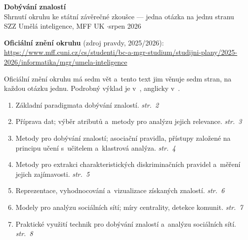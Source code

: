 \documentclass[10pt,a4paper]{article}
\begin{document}
\raggedcolumns   %

\thispagestyle{empty}
\begin{center}
{\LARGE\bfseries Dobývání znalostí}\\[0.4em]
{\large Shrnutí okruhu ke státní závěrečné zkoušce --- jedna otázka na jednu stranu}\\[0.6em]
{\small SZZ Umělá inteligence, MFF UK \quad$\cdot$\quad srpen 2026}
\end{center}

\begin{qbox}{}
\small\raggedright
\textbf{Oficiální znění okruhu} (zdroj pravdy, 2025/2026):\\
{\footnotesize\url{https://www.mff.cuni.cz/cs/studenti/bc-a-mgr-studium/studijni-plany/2025-2026/informatika/mgr/umela-inteligence}}
\end{qbox}

\footnotesize
Oficiální znění okruhu má sedm vět a~tento text jim věnuje sedm stran, na každou otázku jednu.
Podrobný výklad je v~, anglicky v~.

\begin{enumerate}[leftmargin=2em,itemsep=1pt]
\item Základní paradigmata dobývání znalostí. \hfill \textit{str.~2}
\item Příprava dat; výběr atributů a~metody pro analýzu jejich relevance. \hfill \textit{str.~3}
\item Metody pro dobývání znalostí; asociační pravidla, přístupy založené na principu učení
  s~učitelem a~klastrová analýza. \hfill \textit{str.~4}
\item Metody pro extrakci charakteristických diskriminačních pravidel a~měření jejich
  zajímavosti. \hfill \textit{str.~5}
\item Reprezentace, vyhodnocování a~vizualizace získaných znalostí. \hfill \textit{str.~6}
\item Modely pro analýzu sociálních sítí; míry centrality, detekce komunit. \hfill \textit{str.~7}
\item Praktické využití technik pro dobývání znalostí a~analýzu sociálních sítí.
  \hfill \textit{str.~8}
\end{enumerate}
\end{document}
